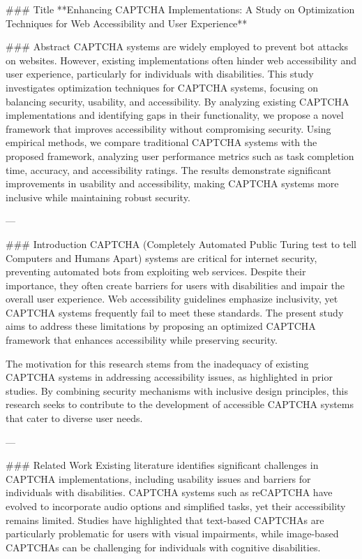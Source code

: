 ### Title
**Enhancing CAPTCHA Implementations: A Study on Optimization Techniques for Web Accessibility and User Experience**

### Abstract
CAPTCHA systems are widely employed to prevent bot attacks on websites. However, existing implementations often hinder web accessibility and user experience, particularly for individuals with disabilities. This study investigates optimization techniques for CAPTCHA systems, focusing on balancing security, usability, and accessibility. By analyzing existing CAPTCHA implementations and identifying gaps in their functionality, we propose a novel framework that improves accessibility without compromising security. Using empirical methods, we compare traditional CAPTCHA systems with the proposed framework, analyzing user performance metrics such as task completion time, accuracy, and accessibility ratings. The results demonstrate significant improvements in usability and accessibility, making CAPTCHA systems more inclusive while maintaining robust security.

---

### Introduction
CAPTCHA (Completely Automated Public Turing test to tell Computers and Humans Apart) systems are critical for internet security, preventing automated bots from exploiting web services. Despite their importance, they often create barriers for users with disabilities and impair the overall user experience. Web accessibility guidelines emphasize inclusivity, yet CAPTCHA systems frequently fail to meet these standards. The present study aims to address these limitations by proposing an optimized CAPTCHA framework that enhances accessibility while preserving security.

The motivation for this research stems from the inadequacy of existing CAPTCHA systems in addressing accessibility issues, as highlighted in prior studies. By combining security mechanisms with inclusive design principles, this research seeks to contribute to the development of accessible CAPTCHA systems that cater to diverse user needs.

---

### Related Work
Existing literature identifies significant challenges in CAPTCHA implementations, including usability issues and barriers for individuals with disabilities. CAPTCHA systems such as reCAPTCHA have evolved to incorporate audio options and simplified tasks, yet their accessibility remains limited. Studies have highlighted that text-based CAPTCHAs are particularly problematic for users with visual impairments, while image-based CAPTCHAs can be challenging for individuals with cognitive disabilities.

